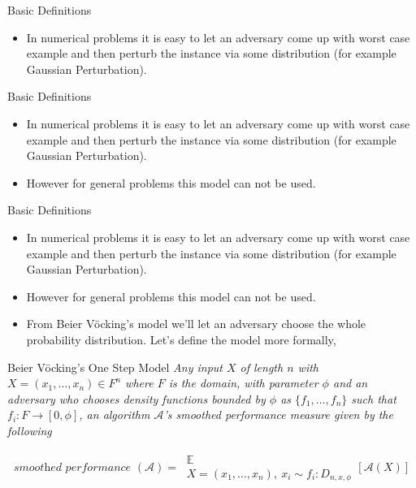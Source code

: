 \begin{frame}{Basic Definitions}
    \begin{itemize}
        \item In numerical problems it is easy to let an adversary come up with worst case example and then perturb the instance via some distribution (for example Gaussian Perturbation).
    \end{itemize}
\end{frame}

\begin{frame}{Basic Definitions}
    \begin{itemize}
        \item In numerical problems it is easy to let an adversary come up with worst case example and then perturb the instance via some distribution (for example Gaussian Perturbation).
        \item However for general problems this model can not be used.
    \end{itemize}
\end{frame}

\begin{frame}{Basic Definitions}
    \begin{itemize}
        \item In numerical problems it is easy to let an adversary come up with worst case example and then perturb the instance via some distribution (for example Gaussian Perturbation).
        \item However for general problems this model can not be used.
        \item From Beier Vöcking's model we'll let an adversary choose the whole probability distribution. Let's define the model more formally,
    \end{itemize}
\end{frame}

\begin{frame}{Beier Vöcking's One Step Model}
    \textit{Any input $X$ of length $n$ with $X = (x_1, \dots, x_n) \in F^n$ where $F$ is the domain, with parameter $\phi$ and an adversary who chooses density functions bounded by $\phi$ as $\{f_1, \dots, f_n\}$ such that $f_i:F\to [0, \phi]$, an algorithm $\mathcal{A}$'s smoothed performance measure given by the following}
    \begin{center}
        \begin{align*}
            \textit{smoothed performance }(\mathcal{A}) = \: \substack{\mathbb{E} \\ {X = (x_1, \dots, x_n), \: x_i \sim f_i: D_{n, x, \phi}}} \left[\mathcal{A}(X)\right]
        \end{align*}
    \end{center}
\end{frame}

